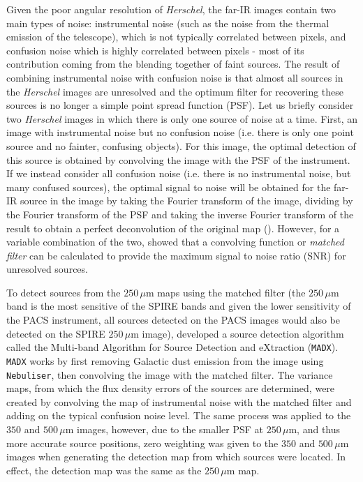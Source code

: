Given the poor angular resolution of \textit{Herschel}, the far-IR images contain two main types of noise: instrumental noise (such as the noise from the thermal emission of the telescope), which is not typically correlated between pixels, and confusion noise which is highly correlated between pixels - most of its contribution coming from the blending together of faint sources. The result of combining instrumental noise with confusion noise is that almost all sources in the \textit{Herschel} images are unresolved and the optimum filter for recovering these sources is no longer a simple point spread function (PSF). Let us briefly consider two \textit{Herschel} images in which there is only one source of noise at a time. First, an image with instrumental noise but no confusion noise (i.e. there is only one point source and no fainter, confusing objects). For this image, the optimal detection of this source is obtained by convolving the image with the PSF of the instrument. If we instead consider all confusion noise (i.e. there is no instrumental noise, but many confused sources), the optimal signal to noise will be obtained for the far-IR source in the image by taking the Fourier transform of the image, dividing by the Fourier transform of the PSF and taking the inverse Fourier transform of the result to obtain a perfect deconvolution of the original map (\citealt{Valiante_2016}). However, for a variable combination of the two, \citealt{Chapin_2011} showed that a convolving function or \textit{matched filter} can be calculated to provide the maximum signal to noise ratio (SNR) for unresolved sources.

To detect sources from the $250\,\mu$m maps using the matched filter (the $250\,\mu$m band is the most sensitive of the SPIRE bands and given the lower sensitivity of the PACS instrument, all sources detected on the PACS images would also be detected on the SPIRE $250\,\mu$m image), \citealt{Maddox_2020} developed a source detection algorithm called the Multi-band Algorithm for Source Detection and eXtraction (\texttt{MADX}). \texttt{MADX} works by first removing Galactic dust emission from the image using \texttt{Nebuliser}, then convolving the image with the matched filter. The variance maps, from which the flux density errors of the sources are determined, were created by convolving the map of instrumental noise with the matched filter and adding on the typical confusion noise level. The same process was applied to the $350$ and $500\,\mu$m images, however, due to the smaller PSF at $250\,\mu$m, and thus more accurate source positions, zero weighting was given to the $350$ and $500\,\mu$m images when generating the detection map from which sources were located. In effect, the detection map was the same as the $250\,\mu$m map.

